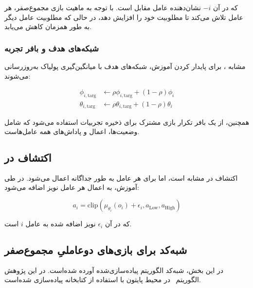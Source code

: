 که در آن $-i$ نشان‌دهنده عامل مقابل است. با توجه به ماهیت بازی مجموع­‌صفر، هر عامل تلاش می‌کند تا مطلوبیت خود را افزایش دهد، در حالی که مطلوبیت عامل دیگر به طور همزمان کاهش می‌یابد.

\subsubsection{شبکه‌های هدف و بافر تجربه}

مشابه ، برای پایدار کردن آموزش، شبکه‌های هدف با میانگین‌گیری پولیاک به‌روزرسانی می‌شوند:

\begin{align*}
    \phi_{i,\text{targ}} &\leftarrow \rho \phi_{i,\text{targ}} + (1 - \rho) \phi_i \\
    \theta_{i,\text{targ}} &\leftarrow \rho \theta_{i,\text{targ}} + (1 - \rho) \theta_i
\end{align*}

همچنین، از یک بافر تکرار بازی مشترک برای ذخیره تجربیات استفاده می‌شود که شامل وضعیت‌ها، اعمال و پاداش‌های همه عامل‌هاست.

\subsection{اکتشاف در }

اکتشاف در  مشابه  است، اما برای هر عامل به طور جداگانه اعمال می‌شود. در طی آموزش، به اعمال هر عامل نویز اضافه می‌شود:

\begin{equation}
    a_i = \text{clip}(\mu_{\theta_i}(o_i) + \epsilon_i, a_{\text{Low}}, a_{\text{High}})
\end{equation}

که در آن $\epsilon_i$ نویز اضافه شده به عامل $i$ است.

\subsection{شبه‌کد  برای بازی‌های دو­عاملیِ مجموع­‌صفر}
       در این بخش، شبه‌کد الگوریتم
پیاده‌سازی‌شده آورده شده‌است. در این پژوهش الگوریتم~ در محیط پایتون با استفاده از کتابخانه
 \cite{paszke2017automatic}
پیاده‌سازی شده‌است.

